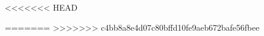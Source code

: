 \documentclass[oneside]{Style/ucasthesis}%
\begin{document}

\frontmatter%


{%
\linespread{1.2}%
\intobmk*{\cleardoublepage}{\contentsname}%
\newpage

\tableofcontents%
\pagestyle{figureheader}


}
\thispagestyle{figureheader}
\mainmatter%



\intotoc*{\cleardoublepage}{\bibname}%
\cleardoublepage%
<<<<<<< HEAD

\appendix%

% 
=======
>>>>>>> c4bb8a8e4d07c80bffd10fe9aeb672bafe56fbee

\thispagestyle{appendixheader}
\backmatter%
\end{document}
